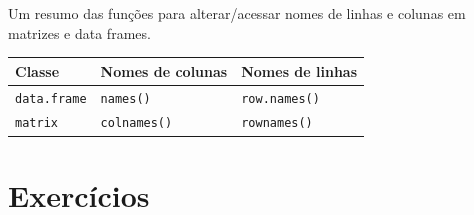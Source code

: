 \documentclass[
  10pt,
  a4paper]{book}
\newenvironment{Shaded}{\begin{snugshade}}{\end{snugshade}}
\newcommand{\DecValTok}[1]{\textcolor[rgb]{0.00,0.00,0.81}{#1}}
\newcommand{\FunctionTok}[1]{\textcolor[rgb]{0.00,0.00,0.00}{#1}}
\newcommand{\NormalTok}[1]{#1}
\newcommand{\SpecialCharTok}[1]{\textcolor[rgb]{0.00,0.00,0.00}{#1}}
\newcommand{\StringTok}[1]{\textcolor[rgb]{0.31,0.60,0.02}{#1}}
\begin{document}
\begin{Shaded}
\end{Shaded}

Um resumo das funções para alterar/acessar nomes de linhas e colunas em
matrizes e data frames.

\begin{longtable}[]{@{}lll@{}}
\toprule()
Classe & Nomes de colunas & Nomes de linhas \\
\midrule()
\endhead
\texttt{data.frame} & \texttt{names()} & \texttt{row.names()} \\
\texttt{matrix} & \texttt{colnames()} & \texttt{rownames()} \\
\bottomrule()
\end{longtable}

\hypertarget{exercuxedcios-4}{%
\section*{Exercícios}\label{exercuxedcios-4}}
\end{document}
